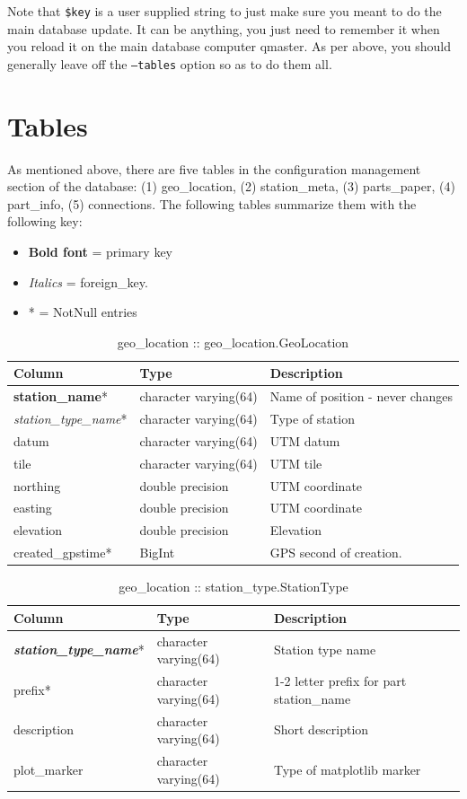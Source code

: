 \documentclass{article}[10pt]
\begin{document}
Note that {\tt \$key} is a user supplied string to just make sure you meant to do the main database update.  It can be anything, you
just need to remember it when you reload it on the main database computer qmaster.
As per above, you should generally leave off the {\tt --tables} option so as to do them all.  

\section{Tables}
As mentioned above, there are five tables in the configuration management section of the database:  (1) geo\_location, (2) station\_meta,
(3) parts\_paper, (4) part\_info, (5) connections.  The following tables summarize them with the following key:  
\begin{itemize}\setlength\itemsep{-.3em}
	\item {\bf Bold font} = primary key
	\item {\em Italics} = foreign\_key.
	\item * = NotNull entries
\end{itemize}

\begin{table}[h]
\centering
\caption{geo\_location :: geo\_location.GeoLocation}
\begin{tabular}{| l | l | l |} \hline
{\bf Column} & {\bf Type} & {\bf Description} \\ \hline
{\bf station\_name}*  & character varying(64) & Name of position - never changes \\ \hline
{\em station\_type\_name}* & character varying(64) & Type of station \\ \hline
datum & character varying(64) & UTM datum \\ \hline
tile & character varying(64) & UTM tile \\ \hline
northing & double precision & UTM coordinate \\ \hline
easting & double precision & UTM coordinate \\ \hline
elevation & double precision & Elevation \\ \hline
created\_gpstime* & BigInt & GPS second of creation. \\ \hline
\end{tabular}
\end{table}

\begin{table}[h]
\centering
\caption{geo\_location :: station\_type.StationType}
\begin{tabular}{| l | l | l |} \hline
{\bf Column} & {\bf Type} & {\bf Description} \\ \hline
{\bf \em station\_type\_name}* &  character varying(64) &  Station type name \\ \hline
prefix* & character varying(64) & 1-2 letter prefix for part station\_name \\ \hline
description & character varying(64) &  Short description \\ \hline
plot\_marker & character varying(64) & Type of matplotlib marker \\ \hline
\end{tabular}
\end{table}
\end{document}
